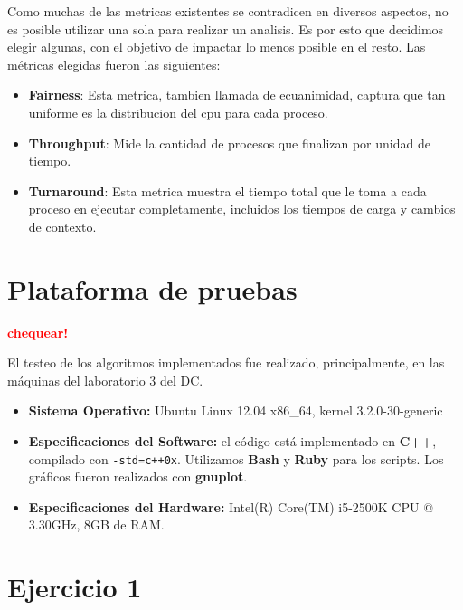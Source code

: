 \documentclass[a4paper]{article}
\begin{document}
Como muchas de las metricas existentes se contradicen en diversos aspectos,
no es posible utilizar una sola para realizar un analisis. Es por esto que
decidimos elegir algunas,  con el objetivo de impactar lo menos posible en
el resto. 
Las métricas elegidas fueron las siguientes:
\begin{itemize}

\item \textbf{Fairness}: Esta metrica, tambien llamada de ecuanimidad,
captura que tan uniforme es la distribucion del cpu para
cada proceso.

\item \textbf{Throughput}: Mide la cantidad de procesos que
finalizan por unidad de tiempo.

\item \textbf{Turnaround}: Esta metrica muestra el tiempo total que le toma
a cada proceso en ejecutar completamente, incluidos los tiempos de carga y
cambios de contexto.


\end{itemize}
\newpage

\section{Plataforma de pruebas}

\textcolor{red}{\textbf{chequear!}} \medskip

El testeo de los algoritmos implementados fue realizado, principalmente, en las máquinas del laboratorio 3 del DC. \newline
\begin{itemize}
  \item \textbf{Sistema Operativo:} Ubuntu Linux 12.04 x86_64, kernel 3.2.0-30-generic

  \item \textbf{Especificaciones del Software:} el código está implementado en \textbf{C++}, compilado con \verb|-std=c++0x|.
  Utilizamos \textbf{Bash} y \textbf{Ruby} para los scripts. Los gráficos fueron realizados con \textbf{gnuplot}.

  \item \textbf{Especificaciones del Hardware:} Intel(R) Core(TM) i5-2500K CPU @ 3.30GHz, 8GB de RAM.
\end{itemize}

\newpage


 \section{Ejercicio 1}
\end{document}

